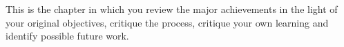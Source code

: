 \documentclass[11pt,openright,twoside,a4paper]{report}
\begin{document}







%

This is the chapter in which you review the major achievements in the
light of your original objectives, critique the process, critique your
own learning and identify possible future work.







\end{document}
